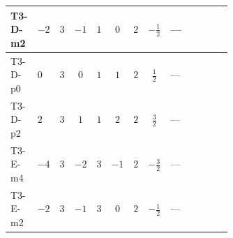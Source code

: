 \documentclass[8pt]{article}
\begin{document}
\begin{landscape}
\begin{longtable}{@{}llcccccc >{\raggedright\arraybackslash}p{0.21\linewidth} >{\raggedright\arraybackslash}p{0.21\linewidth} >{\raggedright\arraybackslash}p{0.21\linewidth}@{}}
\midrule
T3-D-m2 & $-2$ & $3$ & $-1$ & $1$ & $0$ & $2$ & $-\frac{1}{2}$ & --- & \scriptsize\adjustbox{max width=\linewidth}{$\begin{gathered} -2 \operatorname{Tr}\!\left({y_1}\,\left({y_1}\right)^{\dagger}\,{Y_e}\,\left({Y_e}\right)^{\dagger}\right)\end{gathered}$} & \scriptsize\adjustbox{max width=\linewidth}{$\begin{gathered} +4 {\lambda_5} \left({\lambda_5}\right)^{*}\end{gathered}$} \\
\midrule
T3-D-p0 & $0$ & $3$ & $0$ & $1$ & $1$ & $2$ & $\frac{1}{2}$ & --- & \scriptsize\adjustbox{max width=\linewidth}{$\begin{gathered} -2 \operatorname{Tr}\!\left({y_1}\,\left({y_1}\right)^{\dagger}\,{Y_e}\,\left({Y_e}\right)^{\dagger}\right)\end{gathered}$} & \scriptsize\adjustbox{max width=\linewidth}{$\begin{gathered} +4 {\lambda_5} \left({\lambda_5}\right)^{*}\end{gathered}$} \\
\midrule
T3-D-p2 & $2$ & $3$ & $1$ & $1$ & $2$ & $2$ & $\frac{3}{2}$ & --- & \scriptsize\adjustbox{max width=\linewidth}{$\begin{gathered} -2 \operatorname{Tr}\!\left({y_1}\,\left({y_1}\right)^{\dagger}\,{Y_e}\,\left({Y_e}\right)^{\dagger}\right)\end{gathered}$} & \scriptsize\adjustbox{max width=\linewidth}{$\begin{gathered} +4 {\lambda_5} \left({\lambda_5}\right)^{*}\end{gathered}$} \\
\midrule
T3-E-m4 & $-4$ & $3$ & $-2$ & $3$ & $-1$ & $2$ & $-\frac{3}{2}$ & --- & \scriptsize\adjustbox{max width=\linewidth}{$\begin{gathered} -2 \operatorname{Tr}\!\left({y_1}\,\left({y_1}\right)^{\dagger}\,{Y_e}\,\left({Y_e}\right)^{\dagger}\right)\end{gathered}$} & \scriptsize\adjustbox{max width=\linewidth}{$\begin{gathered} +4 {\lambda_5} \left({\lambda_5}\right)^{*}\end{gathered}$} \\
\midrule
T3-E-m2 & $-2$ & $3$ & $-1$ & $3$ & $0$ & $2$ & $-\frac{1}{2}$ & --- & \scriptsize\adjustbox{max width=\linewidth}{$\begin{gathered} -2 \operatorname{Tr}\!\left({y_1}\,\left({y_1}\right)^{\dagger}\,{Y_e}\,\left({Y_e}\right)^{\dagger}\right)\end{gathered}$} & \scriptsize\adjustbox{max width=\linewidth}{$\begin{gathered} +4 {\lambda_5} \left({\lambda_5}\right)^{*}\end{gathered}$} \\

\end{longtable}
\end{landscape}
\end{document}
